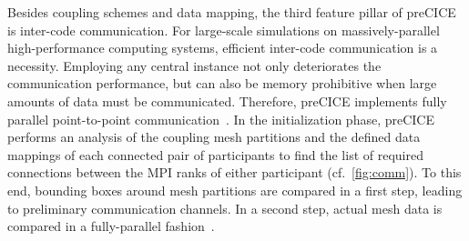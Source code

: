 Besides coupling schemes and data mapping, the third feature pillar of preCICE is inter-code communication. For large-scale simulations on massively-parallel high-performance computing systems, efficient inter-code communication is a necessity. Employing any central instance not only deteriorates the communication performance, but can also be memory prohibitive when large amounts of data must be communicated. Therefore, preCICE implements fully parallel point-to-point communication~\cite{Uekermann2016, Bungartz2016_ExaFSA_LNCSE, Shukaev2015}. 
In the initialization phase, preCICE performs an analysis of the coupling mesh partitions and the defined data mappings of each connected pair of participants to find the list of required connections between the MPI ranks of either participant (cf.~\autoref{fig:comm}). 
To this end, bounding boxes around mesh partitions are compared in a first step, leading to preliminary communication channels. In a second step, actual mesh data is compared in a fully-parallel fashion~\cite{AminPerf2021}.

